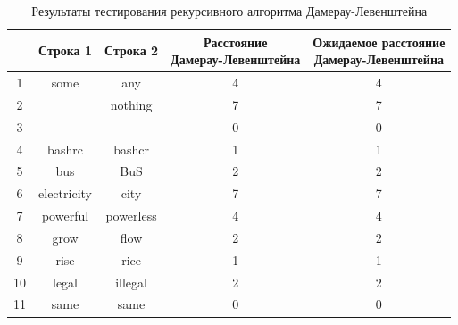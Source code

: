 \begin{table}[H]
    \caption{Результаты тестирования рекурсивного алгоритма Дамерау-Левенштейна}
	\begin{tabular}{|c|c|c|c|c|}
 	\hline
    \No{} & Строка 1 & Строка 2 & \makecell{Расстояние\\Дамерау-Левенштейна} & \makecell{Ожидаемое расстояние\\Дамерау-Левенштейна} \\
 	\hline
 	1 & some & any & 4 & 4\\
 	\hline
 	2 & & nothing & 7 & 7\\
 	\hline
 	3 & & & 0 & 0\\
 	\hline
 	4 & bashrc & bashcr & 1 & 1\\
 	\hline
 	5 & bus & BuS & 2 & 2\\
 	\hline
 	6 & electricity & city & 7 & 7\\
 	\hline
 	7 & powerful & powerless & 4 & 4\\
 	\hline
 	8 & grow & flow & 2 & 2\\
 	\hline
 	9 & rise & rice & 1 & 1\\
 	\hline
    10 & legal & illegal & 2 & 2\\
 	\hline
    11 & same & same & 0 & 0\\
    \hline
	\end{tabular}
\end{table}

